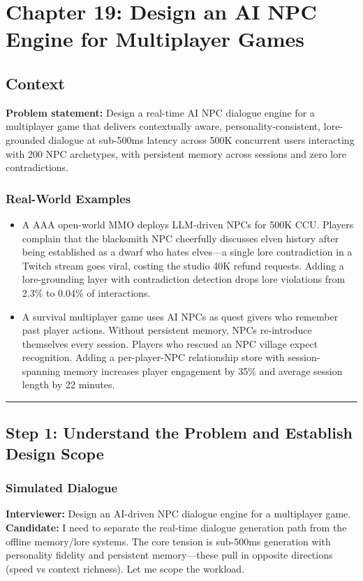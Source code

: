 \chapter{Chapter 19: Design an AI NPC Engine for Multiplayer Games}

\section*{Context}
\textbf{Problem statement:} Design a real-time AI NPC dialogue engine for a multiplayer game that delivers contextually aware, personality-consistent, lore-grounded dialogue at sub-500ms latency across 500K concurrent users interacting with 200 NPC archetypes, with persistent memory across sessions and zero lore contradictions.

\subsection*{Real-World Examples}
\begin{itemize}
  \item A AAA open-world MMO deploys LLM-driven NPCs for 500K CCU. Players complain that the blacksmith NPC cheerfully discusses elven history after being established as a dwarf who hates elves---a single lore contradiction in a Twitch stream goes viral, costing the studio 40K refund requests. Adding a lore-grounding layer with contradiction detection drops lore violations from 2.3\% to 0.04\% of interactions.
  \item A survival multiplayer game uses AI NPCs as quest givers who remember past player actions. Without persistent memory, NPCs re-introduce themselves every session. Players who rescued an NPC village expect recognition. Adding a per-player-NPC relationship store with session-spanning memory increases player engagement by 35\% and average session length by 22 minutes.
\end{itemize}

\bigskip\hrule\bigskip

\section*{Step 1: Understand the Problem and Establish Design Scope}

\subsection*{Simulated Dialogue}
\textbf{Interviewer:} Design an AI-driven NPC dialogue engine for a multiplayer game.\\
\textbf{Candidate:} I need to separate the real-time dialogue generation path from the offline memory/lore systems. The core tension is sub-500ms generation with personality fidelity and persistent memory---these pull in opposite directions (speed vs context richness). Let me scope the workload.

